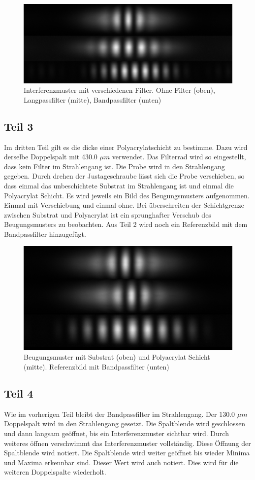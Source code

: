 \documentclass[12pt,a4paper,twoside]{article}
\begin{document}
\begin{figure}[H]
    \centering
    \includegraphics[width=0.6\linewidth]{nudes/aufgabe 2.jpg}
    \caption{Interferenzmuster mit verschiedenen Filter. Ohne Filter (oben), Langpassfilter (mitte), Bandpassfilter (unten) }
    \label{fig:aufgabe 2}
\end{figure}

\subsection{Teil 3}
Im dritten Teil gilt es die dicke einer Polyacrylatschicht zu bestimme. Dazu wird derselbe Doppelspalt mit 430.0 $\mu m$ verwendet. Das Filterrad wird so eingestellt, dass kein Filter im Strahlengang ist. 
Die Probe wird in den Strahlengang gegeben. Durch drehen der Justageschraube lässt sich die Probe verschieben, so dass einmal das unbeschichtete Substrat im Strahlengang ist und einmal die Polyacrylat Schicht. 
Es wird jeweils ein Bild des Beugungsmusters aufgenommen. Einmal mit Verschiebung und einmal ohne. Bei überschreiten der Schichtgrenze zwischen Substrat und Polyacrylat ist ein sprunghafter Verschub des Beugungsmusters zu beobachten. 
Aus Teil 2 wird noch ein Referenzbild mit dem Bandpassfilter hinzugefügt. 

\begin{figure}[H]
    \centering
    \includegraphics[width=0.6\linewidth]{nudes/aufgabe 3.jpg}
    \caption{Beugungsmuster mit Substrat (oben) und Polyacrylat Schicht (mitte). Referenzbild mit Bandpassfilter (unten)}
    \label{fig:aufgabe 3}
\end{figure}

\subsection{Teil 4}
Wie im vorherigen Teil bleibt der Bandpassfilter im Strahlengang. 
Der 130.0 $\mu m$ Doppelspalt wird in den Strahlengang gesetzt. Die Spaltblende wird geschlossen und dann langsam geöffnet, bis ein Interferenzmuster sichtbar wird. 
Durch weiteres öffnen verschwimmt das Interferenzmuster vollständig. Diese Öffnung der Spaltblende wird notiert. 
Die Spaltblende wird weiter geöffnet bis wieder Minima und Maxima erkennbar sind. Dieser Wert wird auch notiert. 
Dies wird für die weiteren Doppelspalte wiederholt.  
\end{document}
